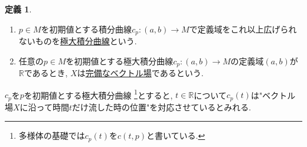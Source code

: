 \documentclass[dvipdfmx,a4paper,11pt]{article}
\newcommand{\R}{\mathbb{R}}
\theoremstyle{definition}
\newtheorem{dfn}[thm]{定義}
\begin{document}
    \begin{tcolorbox}[
    colback = white,
    colframe = green!35!black,
    fonttitle = \bfseries,
    breakable = true]
    \begin{dfn}
      \text{}
      \begin{enumerate}
          \setlength{\parskip}{0cm}
  \setlength{\itemsep}{2pt} 
      \item $p \in M$を初期値とする積分曲線$c_{p} : (a,b) \rightarrow M$で定義域をこれ以上広げられないものを\underline{極大積分曲線}という.
      \item 任意の$p \in M$を初期値とする極大積分曲線$c_{p} : (a,b) \rightarrow M$の定義域$(a,b)$が$\R$であるとき, $X$は\underline{完備なベクトル場}であるという. 
      \end{enumerate}
    \end{dfn}
    \end{tcolorbox}
$c_{p}$を$p$を初期値とする極大積分曲線 \footnote{多様体の基礎では$c_{p}(t)$を$c(t,p)$と書いている.}とすると, $t \in \R$について$c_{p}(t)$は"ベクトル場$X$に沿って時間$t$だけ流した時の位置"を対応させているとみれる.
\end{document}
